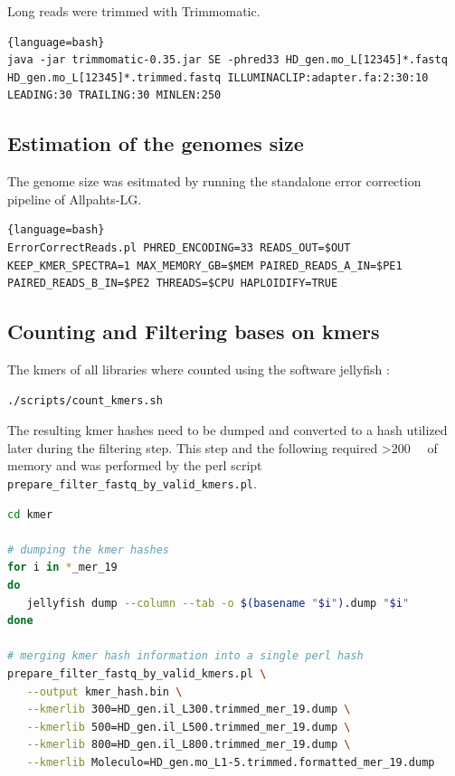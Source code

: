 \documentclass[12pt,a4paper]{scrartcl}
\begin{document}
Long reads were trimmed with Trimmomatic.

\begin{lstlisting}{language=bash}
java -jar trimmomatic-0.35.jar SE -phred33 HD_gen.mo_L[12345]*.fastq HD_gen.mo_L[12345]*.trimmed.fastq ILLUMINACLIP:adapter.fa:2:30:10 LEADING:30 TRAILING:30 MINLEN:250
\end{lstlisting}

\subsection*{Estimation of the genomes size}

The genome size was esitmated by running the standalone error correction pipeline of Allpahts-LG.

\begin{lstlisting}{language=bash}
ErrorCorrectReads.pl PHRED_ENCODING=33 READS_OUT=$OUT KEEP_KMER_SPECTRA=1 MAX_MEMORY_GB=$MEM PAIRED_READS_A_IN=$PE1 PAIRED_READS_B_IN=$PE2 THREADS=$CPU HAPLOIDIFY=TRUE
\end{lstlisting}

\subsection*{Counting and Filtering bases on kmers}

The kmers of all libraries where counted using the software jellyfish \parencite{Marcais2011}:

\begin{lstlisting}[language=bash]
./scripts/count_kmers.sh
\end{lstlisting}

The resulting kmer hashes need to be dumped and converted to a hash
utilized later during the filtering step. This step and the following
required \SI{>200}{\giga\byte} of memory and was performed by the perl
script \texttt{prepare\_filter\_fastq\_by\_valid\_kmers.pl}.

\begin{lstlisting}[language=bash]
cd kmer

# dumping the kmer hashes
for i in *_mer_19
do
   jellyfish dump --column --tab -o $(basename "$i").dump "$i"
done

# merging kmer hash information into a single perl hash
prepare_filter_fastq_by_valid_kmers.pl \
   --output kmer_hash.bin \
   --kmerlib 300=HD_gen.il_L300.trimmed_mer_19.dump \
   --kmerlib 500=HD_gen.il_L500.trimmed_mer_19.dump \
   --kmerlib 800=HD_gen.il_L800.trimmed_mer_19.dump \
   --kmerlib Moleculo=HD_gen.mo_L1-5.trimmed.formatted_mer_19.dump
\end{lstlisting}
\end{document}
